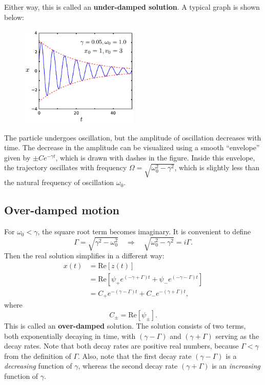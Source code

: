 \documentclass[10pt,a4paper]{article}
\begin{document}
Either way, this is called an \textbf{under-damped solution}. A
typical graph is shown below:

\begin{figure}[h]
  \centering\includegraphics[width=0.5\textwidth]{underdamped}
\end{figure}

\noindent
The particle undergoes oscillation, but the amplitude of oscillation
decreases with time. The decrease in the amplitude can be visualized
using a smooth ``envelope'' given by $\pm C e^{-\gamma t}$, which is
drawn with dashes in the figure. Inside this envelope, the trajectory
oscillates with frequency $\Omega = \sqrt{\omega_0^2 - \gamma^2}$,
which is slightly less than the natural frequency of oscillation
$\omega_0$.

\subsection{Over-damped motion}\label{over-damped-motion}

For $\omega_0 < \gamma$, the square root term becomes imaginary. It is
convenient to define
\begin{equation}
  \Gamma = \sqrt{\gamma^2 - \omega_0^2} \quad \Rightarrow \quad \sqrt{\omega_0^2 - \gamma^2} = i \Gamma.
\end{equation}
Then the real solution simplifies in a different way:
\begin{align}
  x(t) &= \mathrm{Re}\left[z(t)\right] \\
  &= \mathrm{Re}\left[\psi_+ e^{\left(-\gamma  + \Gamma\right)t} + \psi_- e^{\left(-\gamma - \Gamma\right)t} \right] \\
  &= C_+ e^{-(\gamma - \Gamma) t} + C_- e^{-(\gamma + \Gamma) t},
\end{align}
where
\begin{equation}
  C_\pm = \mathrm{Re}[\psi_\pm].
\end{equation}
This is called an \textbf{over-damped} solution. The solution consists
of two terms, both exponentially decaying in time, with
$(\gamma-\Gamma)$ and $(\gamma + \Gamma)$ serving as the decay
rates. Note that both decay rates are positive real numbers, because
$\Gamma < \gamma$ from the definition of $\Gamma$. Also, note that the
first decay rate $(\gamma - \Gamma)$ is a \emph{decreasing} function
of $\gamma$, whereas the second decay rate $(\gamma + \Gamma)$ is an
\emph{increasing} function of $\gamma$.
    
\end{document}
